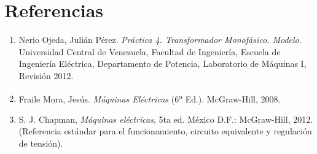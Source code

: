 \documentclass[12pt]{article}
\begin{document}
\newpage

\section{Referencias}
\begin{enumerate}
    \item Nerio Ojeda, Juli\'an P\'erez. \textit{Pr\'actica 4. Transformador Monof\'asico. Modelo}. Universidad Central de Venezuela, Facultad de Ingenier\'ia, Escuela de Ingenier\'ia El\'ectrica, Departamento de Potencia, Laboratorio de M\'aquinas I, Revisi\'on 2012.
    \item Fraile Mora, Jes\'us. \textit{M\'aquinas El\'ectricas} (6\textsuperscript{a} Ed.). McGraw-Hill, 2008.
    \item S. J. Chapman, \textit{M\'aquinas el\'ectricas}, 5ta ed. M\'exico D.F.: McGraw-Hill, 2012. (Referencia est\'andar para el funcionamiento, circuito equivalente y regulaci\'on de tensi\'on).
\end{enumerate}
\end{document}
